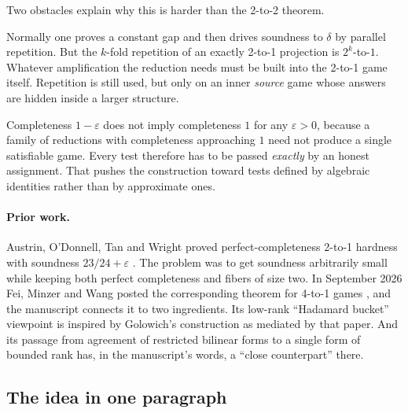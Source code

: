 \documentclass[11pt]{article}
\theoremstyle{definition}
\theoremstyle{remark}
\newcommand{\eps}{\varepsilon}
\begin{document}
Two obstacles explain why this is harder than the 2-to-2 theorem.

\begin{idea}
Normally one proves a constant gap and then drives soundness to $\delta$ by
parallel repetition. But the $k$-fold repetition of an exactly 2-to-1
projection is $2^k$-to-$1$. Whatever amplification the reduction needs must be
built into the 2-to-1 game itself. Repetition is still used, but only on an
inner \emph{source} game whose answers are hidden inside a larger structure.
\end{idea}

\begin{idea}
Completeness $1-\eps$ does not imply completeness $1$ for any $\eps>0$,
because a family of reductions with completeness approaching $1$ need not
produce a single satisfiable game. Every test therefore has to be passed
\emph{exactly} by an honest assignment. That pushes the construction toward
tests defined by algebraic identities rather than by approximate ones.
\end{idea}

\paragraph{Prior work.} Austrin, O'Donnell, Tan and Wright proved
perfect-completeness 2-to-1 hardness with soundness $23/24+\eps$ \cite{AOTW}.
The problem was to get soundness arbitrarily small while keeping both perfect
completeness and fibers of size two. In September 2026 Fei, Minzer and Wang
posted the corresponding theorem for 4-to-1 games \cite{FMW}, and the
manuscript connects it to two ingredients. Its low-rank ``Hadamard bucket''
viewpoint is inspired by Golowich's construction \cite{Golowich} as mediated
by that paper. And its passage from agreement of restricted bilinear forms to
a single form of bounded rank has, in the manuscript's words, a ``close
counterpart'' there.

\subsection{The idea in one paragraph}
\end{document}
